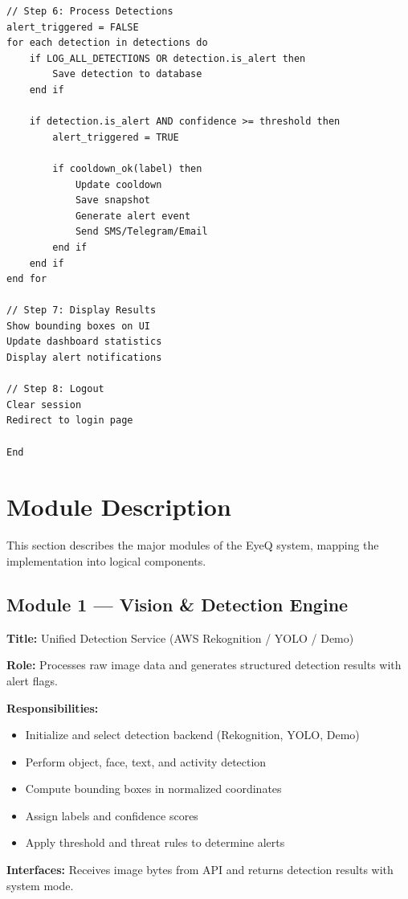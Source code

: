 \documentclass[10pt,openany]{report}
\begin{document}
\begin{sloppypar}
{{{\begin{sloppypar}
\begin{lstlisting}
// Step 6: Process Detections
alert_triggered = FALSE
for each detection in detections do
    if LOG_ALL_DETECTIONS OR detection.is_alert then
        Save detection to database
    end if

    if detection.is_alert AND confidence >= threshold then
        alert_triggered = TRUE

        if cooldown_ok(label) then
            Update cooldown
            Save snapshot
            Generate alert event
            Send SMS/Telegram/Email
        end if
    end if
end for

// Step 7: Display Results
Show bounding boxes on UI
Update dashboard statistics
Display alert notifications

// Step 8: Logout
Clear session
Redirect to login page

End
\end{lstlisting}

\section{Module Description}


This section describes the major modules of the EyeQ system, mapping the implementation into logical components.

\subsection{Module 1 — Vision \& Detection Engine}
\textbf{Title:} Unified Detection Service (AWS Rekognition / YOLO / Demo)

\textbf{Role:}  
Processes raw image data and generates structured detection results with alert flags.

\textbf{Responsibilities:}
\begin{itemize}
    \item Initialize and select detection backend (Rekognition, YOLO, Demo)
    \item Perform object, face, text, and activity detection
    \item Compute bounding boxes in normalized coordinates
    \item Assign labels and confidence scores
    \item Apply threshold and threat rules to determine alerts
\end{itemize}

\textbf{Interfaces:}  
Receives image bytes from API and returns detection results with system mode.


\end{sloppypar}}}}
\end{sloppypar}
\end{document}
